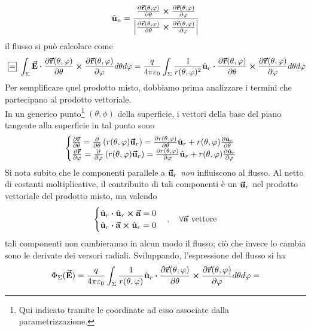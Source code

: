 \begin{demonstration}
	\begin{equation*}
		\hat{\mathbf{u}}_n=\frac{\pdv{\vb*{\va{r}}(\theta,\varphi)}{\theta}\cross\pdv{\vb*{\va{r}}(\theta,\varphi)}{\varphi}}{\abs{\pdv{\vb*{\va{r}}(\theta,\varphi)}{\theta}\cross\pdv{\vb*{\va{r}}(\theta,\varphi)}{\varphi}}}
	\end{equation*}
	il flusso si può calcolare come
	\begin{equation*}
		\squarequal\int_{\Sigma}\vba{E}\vdot\pdv{\vba{r}(\theta,\phi)}{\theta}\cross\pdv{\vba{r}(\theta,\phi)}{\phi} d\theta d\phi=\frac{q}{4\pi\epsilon_0}\int_{\Sigma}\frac{1}{r(\theta,\phi)^2}\vbh{u}_r\vdot \pdv{\vba{r}(\theta,\phi)}{\theta}\cross\pdv{\vba{r}(\theta,\phi)}{\phi} d\theta d\phi
	\end{equation*}
	Per semplificare quel prodotto misto, dobbiamo prima analizzare i termini che partecipano al prodotto vettoriale.\\
	In un generico punto\footnote{Qui indicato tramite le coordinate ad esso associate dalla parametrizzazione.} $\left(\theta,\phi\right)$ della superficie, i vettori della base del piano tangente alla superficie in tal punto sono
	\begin{equation*}
		\begin{cases}
			\pdv{\vb*{\va{r}}}{\theta}=\pdv{\theta}\left(r(\theta,\varphi)\vb*{\va{u}}_r\right)=\pdv{r(\theta,\varphi)}{\theta}\hat{\mathbf{u}}_r+r(\theta,\varphi)\pdv{\hat{\mathbf{u}}_r}{\theta}\\
			\pdv{\vb*{\va{r}}}{\varphi}=\pdv{\varphi}\left(r(\theta,\varphi)\vb*{\va{u}}_r\right)=\pdv{r(\theta,\varphi)}{\varphi}\hat{\mathbf{u}}_r+r(\theta,\varphi)\pdv{\hat{\mathbf{u}}_r}{\varphi}\\
		\end{cases}
	\end{equation*}
	Si nota subito che  le componenti parallele a $\vb*{\va{u}}_r$ \textit{non} influiscono al flusso. Al netto di costanti moltiplicative, il contribuito di tali componenti è un $\vb*{\va{u}}_r$ nel prodotto vettoriale del prodotto misto, ma valendo
\begin{equation*}
	\begin{cases}
		\vbh{u}_r\vdot\vbh{u}_r\cross\vba{a}=0\\
		\vbh{u}_r\vdot\vba{a}\cross\vbh{u}_r=0
	\end{cases},\quad\forall \vba{a}\text{ vettore}
\end{equation*}
tali componenti non cambieranno in alcun modo il flusso; ciò che invece lo cambia sono le derivate dei versori radiali. Sviluppando, l'espressione del flusso si ha
\begin{align*}
	\Phi_{\Sigma}(\vba{E})&=\frac{q}{4\pi\epsilon_0}\int_{\Sigma}\frac{1}{r(\theta,\phi)}\vbh{u}_r\vdot \pdv{\vba{r}(\theta,\phi)}{\theta}\cross\pdv{\vba{r}(\theta,\phi)}{\phi} d\theta d\phi=\\

\end{align*}
\end{demonstration}
